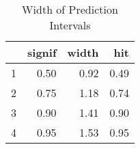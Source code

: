 \begin{table}[ht]
\centering
\begin{tabular}{rrrr}
  \toprule
 & signif & width & hit \\ 
  \midrule
1 & 0.50 & 0.92 & 0.49 \\ 
  2 & 0.75 & 1.18 & 0.74 \\ 
  3 & 0.90 & 1.41 & 0.90 \\ 
  4 & 0.95 & 1.53 & 0.95 \\ 
   \bottomrule
\end{tabular}
\caption{Width of Prediction Intervals} 
\end{table}

